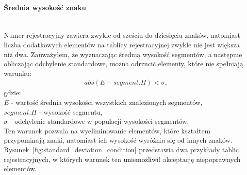 \paragraph{Średnia wysokość znaku}\mbox{}\\
Numer rejestracyjny zawiera zwykle od sześciu do dziesięciu znaków, natomiast liczba dodatkowych elementów na tablicy rejestracyjnej zwykle nie jest większa niż dwa. Zauważyłem, że wyznaczając średnią wysokość segmentów, a następnie obliczając odchylenie standardowe, można odrzucić elementy, które nie spełniają warunku:
\begin{gather*}
  abs(E-segment.H) < \sigma,
\end{gather*}
gdzie:\\
$E$ - wartość średnia wysokości wszystkich znalezionych segmentów, \\
$segment.H$ - wysokość segmentu,\\
$\sigma$ - odchylenie standardowe w populacji wysokości segmentów.\\
Ten warunek pozwala na wyeliminowanie elementów, które kształtem przypominają znaki, natomiast ich wysokość wyróżnia się od innych znaków. Rysunek~\ref{fig:standard_deviation_condition} przedstawia dwa przykłady tablic rejestracyjnych, w których warunek ten uniemożliwił akceptację niepoprawnych elementów.
